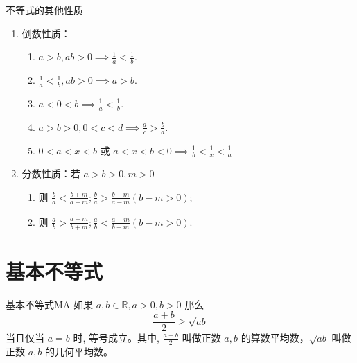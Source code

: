 \vspace{1cm}
\begin{property}\label{property:inequality-others}
不等式的其他性质
\begin{enumerate}
\item 倒数性质：
  \begin{enumerate}
        \item $\displaystyle a>b , ab>0 \implies \frac{1}{a} < \frac{1}{b}$.
        \item $\displaystyle \frac{1}{a}<\frac{1}{b}, ab>0 \implies a>b$.
        \item $\displaystyle a<0<b \implies \frac{1}{a}<\frac{1}{b}$.
        \item $\displaystyle a>b>0, 0<c<d \implies \frac{a}{c}>\frac{b}{d}$.
        \item $0<a<x<b$ 或 $\displaystyle a<x<b<0 \implies \frac{1}{b}<\frac{1}{x}<\frac{1}{a}$
  \end{enumerate}
\item 分数性质：若 $a>b>0, m>0$ \\
\begin{enumerate}
        \item 则 $\displaystyle \frac{b}{a} < \frac{b+m}{a+m}; \frac{b}{a} > \frac{b-m}{a-m} (b-m>0)$;\\
        \item 则 $\displaystyle \frac{a}{b} > \frac{a+m}{b+m}; \frac{a}{b} < \frac{a-m}{b-m} (b-m>0)$.
\end{enumerate}
\end{enumerate}
\end{property}


\section{基本不等式}

\begin{definition}{基本不等式}{MA}
如果 $a, b \in \mathbb{R}, a>0, b>0$ 那么
\begin{equation}
\displaystyle \frac{a+b}{2} \geq \sqrt{ab} 
\end{equation}
当且仅当 $a=b$ 时, 等号成立。其中, $\displaystyle \frac{a+b}{2}$ 叫做正数 $a, b$ 的算数平均数，$\sqrt{ab}$ 叫做正数 $a, b$ 的几何平均数。
\end{definition}

